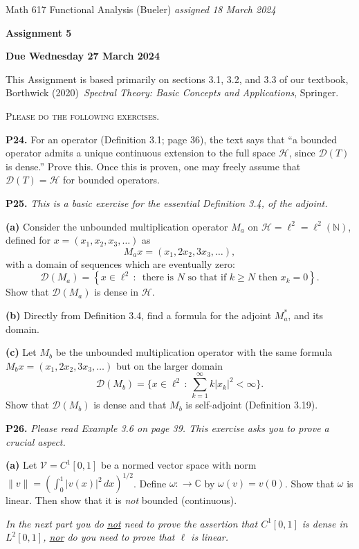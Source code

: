 \documentclass[12pt]{amsart}
\newcommand{\cD}{\mathcal{D}}
\newcommand{\cH}{\mathcal{H}}
\newcommand{\cV}{\mathcal{V}}
\newcommand{\CC}{\mathbb{C}}
\newcommand{\NN}{\mathbb{N}}
\newcommand{\prob}[1]{\bigskip\noindent\textbf{#1.}\quad }
\newcommand{\epart}[1]{\medskip\noindent\textbf{(#1)}\quad }
\begin{document}
\scriptsize \noindent Math 617 Functional Analysis (Bueler) \hfill \emph{assigned 18 March 2024}
\normalsize\medskip

\Large\centerline{\textbf{Assignment 5}}
\large
\medskip

\centerline{\textbf{Due Wednesday 27 March 2024}}
\medskip
\normalsize

\thispagestyle{empty}

\bigskip
\noindent This Assignment is based primarily on sections 3.1, 3.2, and 3.3 of our textbook, Borthwick (2020)~\emph{Spectral Theory: Basic Concepts and Applications}, Springer.

\medskip
\noindent \textsc{Please do the following exercises.}
\smallskip


\prob{P24}  For an operator (Definition 3.1; page 36), the text says that ``a bounded operator admits a unique continuous extension to the full space $\cH$, since $\cD(T)$ is dense.''  Prove this.  Once this is proven, one may freely assume that $\cD(T) = \cH$ for bounded operators.


\prob{P25}  \emph{This is a basic exercise for the essential Definition 3.4, of the adjoint.}

\epart{a} Consider the unbounded multiplication operator $M_a$ on $\cH=\ell^2=\ell^2(\NN)$, defined for $x=(x_1,x_2,x_3,\dots)$ as
	$$M_a x = (x_1, 2 x_2, 3 x_3, \dots),$$
with a domain of sequences which are eventually zero:
	$$\cD(M_a) = \left\{x \in \ell^2\,:\,\text{ there is $N$ so that if $k\ge N$ then } x_k=0\right\}.$$
Show that $\cD(M_a)$ is dense in $\cH$.

\epart{b} Directly from Definition 3.4, find a formula for the adjoint $M_a^*$, and its domain.

\epart{c} Let $M_b$ be the unbounded multiplication operator with the same formula $M_b x = (x_1, 2 x_2, 3 x_3, \dots)$ but on the larger domain
    $$\cD(M_b) = \Big\{x \in \ell^2\,:\, \sum_{k=1}^\infty k|x_k|^2 < \infty\Big\}.$$
Show that $\cD(M_b)$ is dense and that $M_b$ is self-adjoint (Definition 3.19).


\prob{P26}  \emph{Please read Example 3.6 on page 39.  This exercise asks you to prove a crucial aspect.}

\epart{a} Let $\cV = C^1[0,1]$ be a normed vector space with norm $\|v\| = \left(\int_0^1 |v(x)|^2\,dx\right)^{1/2}$.  Define $\omega: \to \CC$ by $\omega(v) = v(0)$.  Show that $\omega$ is linear.  Then show that it is \emph{not} bounded (continuous).

\clearpage\newpage
\noindent \emph{In the next part you do \underline{not} need to prove the assertion that $C^1[0,1]$ is dense in $L^2[0,1]$, \underline{nor} do you need to prove that $\ell$ is linear.}
\end{document}
